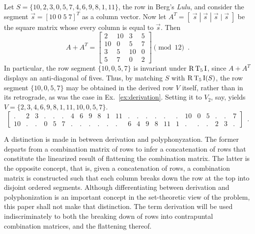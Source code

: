 \begin{example}
    \label{ex:derivation-ordered}
    Let $S = \{ 10, 2, 3, 0, 5, 7, 4, 6, 9, 8, 1, 11 \}$, the row in Berg's \emph{Lulu}, and consider the segment $\vec{s} = [10 \; 0 \; 5 \; 7]^T$ as a column vector. Now let $A^T = [\;\vec{s} \; | \; \vec{s} \; | \; \vec{s} \; | \; \vec{s}\;]$ be the square matrix whose every column is equal to $\vec{s}$. Then
	\begin{equation}
    	A + A^T = \begin{bmatrix}
    		2 & 10 & 3 & 5 \\
        	10 & 0 & 5 & 7 \\
        	3 & 5 & 10 & 0 \\
        	5 & 7 & 0 & 2
        \end{bmatrix} \pmod{12} \enspace.
	\end{equation}
	\noindent In particular, the row segment $\{ 10, 0, 5, 7 \}$ is invariant under $\operatorname{R}\operatorname{T}_5\operatorname{I}$, since $A + A^T$ displays an anti-diagonal of fives. Thus, by matching $S$ with $\operatorname{R}\operatorname{T}_5\operatorname{I}(S)$, the row segment $\{ 10, 0, 5, 7 \}$ may be obtained in the derived row $V$ itself, rather than in its retrograde, as was the case in Ex.~\ref{ex:derivation}. Setting it to $V_2$, say, yields $V = \{ 2, 3, 4, 6, 9, 8, 1, 11, 10, 0, 5, 7 \}$.
	\begin{equation}
    	\left[
    	\begin{array}{cccccccccccc|cccccccccccc}
        	. & 2 & 3 & . & . & . & 4 & 6 & 9 & 8 & 1 & 11 & . & . & . & . & . & . & 10 & 0 & 5 & . & . & 7 \\
        	10 & . & . & 0 & 5 & 7 & . & . & . & . & . & . & 6 & 4 & 9 & 8 & 11 & 1 & . & . & . & 2 & 3 & .
    	\end{array}
    	\right] \enspace.
	\end{equation}
\end{example}

A distinction is made in \cite[211, 214]{Starr1984} between derivation and polyphonyzation. The former departs from a combination matrix of rows to infer a concatenation of rows that constitute the linearized result of flattening the combination matrix. The latter is the opposite concept, that is, given a concatenation of rows, a combination matrix is constructed such that each column breaks down the row at the top into disjoint ordered segments. Although differentiating between derivation and polyphonization is an important concept in the set-theoretic view of the problem, this paper shall not make that distinction. The term derivation will be used indiscriminately to both the breaking down of rows into contrapuntal combination matrices, and the flattening thereof.

